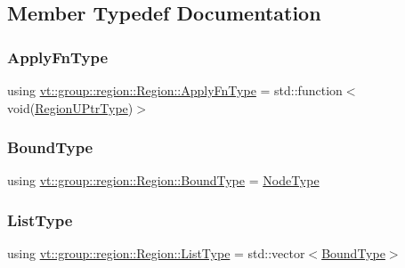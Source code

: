 \subsection{Member Typedef Documentation}
\mbox{\label{structvt_1_1group_1_1region_1_1_region_a7c9e99b1157d2fe2f3e6fc36a1463a96}} 
\subsubsection{\texorpdfstring{Apply\+Fn\+Type}{ApplyFnType}}
{\footnotesize\ttfamily using \hyperlink{structvt_1_1group_1_1region_1_1_region_a7c9e99b1157d2fe2f3e6fc36a1463a96}{vt\+::group\+::region\+::\+Region\+::\+Apply\+Fn\+Type} =  std\+::function$<$void(\hyperlink{structvt_1_1group_1_1region_1_1_region_ae5f42cf159116a3cf8bd65423eb01037}{Region\+U\+Ptr\+Type})$>$}

\mbox{\label{structvt_1_1group_1_1region_1_1_region_abf426ff85bed72c1c6524fad6a9f1751}} 
\subsubsection{\texorpdfstring{Bound\+Type}{BoundType}}
{\footnotesize\ttfamily using \hyperlink{structvt_1_1group_1_1region_1_1_region_abf426ff85bed72c1c6524fad6a9f1751}{vt\+::group\+::region\+::\+Region\+::\+Bound\+Type} =  \hyperlink{namespacevt_a866da9d0efc19c0a1ce79e9e492f47e2}{Node\+Type}}

\mbox{\label{structvt_1_1group_1_1region_1_1_region_a4e35b2fc6dca06aca0b7bc0e19b35c5a}} 
\subsubsection{\texorpdfstring{List\+Type}{ListType}}
{\footnotesize\ttfamily using \hyperlink{structvt_1_1group_1_1region_1_1_region_a4e35b2fc6dca06aca0b7bc0e19b35c5a}{vt\+::group\+::region\+::\+Region\+::\+List\+Type} =  std\+::vector$<$\hyperlink{structvt_1_1group_1_1region_1_1_region_abf426ff85bed72c1c6524fad6a9f1751}{Bound\+Type}$>$}

